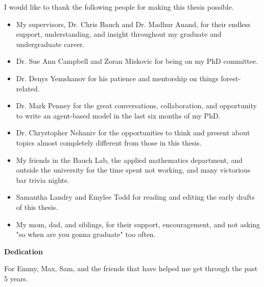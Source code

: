 I would like to thank the following people for making this thesis possible.

\begin{itemize}
\item My supervisors, Dr. Chris Bauch and Dr. Madhur Anand, for their endless support, understanding, and insight throughout my graduate and undergraduate career.  
  
\item Dr. Sue Ann Campbell and Zoran Miskovic for being on my PhD committee.

\item Dr. Denys Yemshanov for his patience and mentorship on things forest-related. 

\item Dr. Mark Penney for the great conversations, collaboration, and opportunity to write an agent-based model in the last six months of my PhD.

\item Dr. Chrystopher Nehaniv for the opportunities to think and present about topics almost completely different from those in this thesis. 

\item My friends in the Bauch Lab, the applied mathematics department, and outside the university for the time spent not working, and many victorious bar trivia nights.
 
\item Samantha Landry and Emylee Todd for reading and editing the early drafts of this thesis.

\item My mom, dad, and siblings, for their support, encouragement, and not asking "so when are you gonna graduate" too often.  
\end{itemize}

 
\cleardoublepage


\begin{center}\textbf{Dedication}\end{center}

For Emmy, Max, Sam, and the friends that have helped me get through the past 5 years.


\cleardoublepage

\renewcommand\contentsname{Table of Contents}
\tableofcontents
\cleardoublepage
{}    %

\listoffigures
\cleardoublepage
{}		%

\listoftables
\cleardoublepage
{}		%


